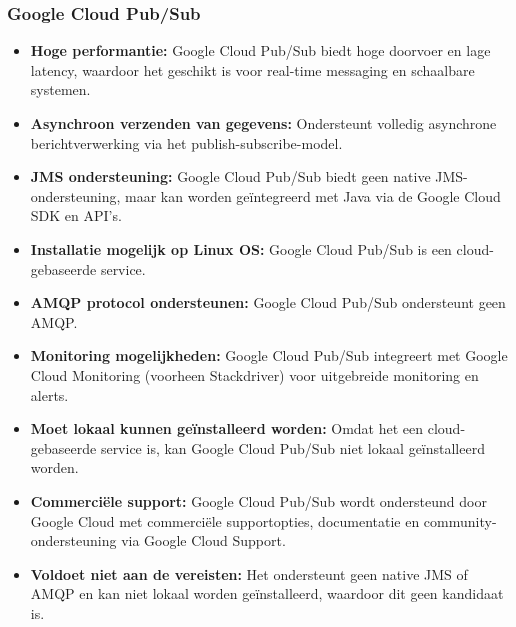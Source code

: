 \subsubsection{Google Cloud Pub/Sub}
\begin{itemize}
    \item \textbf{Hoge performantie:} Google Cloud Pub/Sub biedt hoge doorvoer en lage latency, waardoor het geschikt is voor real-time messaging en schaalbare systemen.
    \item \textbf{Asynchroon verzenden van gegevens:} Ondersteunt volledig asynchrone berichtverwerking via het publish-subscribe-model.
    \item \textbf{JMS ondersteuning:} Google Cloud Pub/Sub biedt geen native JMS-ondersteuning, maar kan worden geïntegreerd met Java via de Google Cloud SDK en API's.
    \item \textbf{Installatie mogelijk op Linux OS:} Google Cloud Pub/Sub is een cloud-gebaseerde service.
    \item \textbf{AMQP protocol ondersteunen:} Google Cloud Pub/Sub ondersteunt geen AMQP.
    \item \textbf{Monitoring mogelijkheden:} Google Cloud Pub/Sub integreert met Google Cloud Monitoring (voorheen Stackdriver) voor uitgebreide monitoring en alerts.
    \item \textbf{Moet lokaal kunnen geïnstalleerd worden:} Omdat het een cloud-gebaseerde service is, kan Google Cloud Pub/Sub niet lokaal geïnstalleerd worden.
    \item \textbf{Commerciële support:} Google Cloud Pub/Sub wordt ondersteund door Google Cloud met commerciële supportopties, documentatie en community-ondersteuning via Google Cloud Support.
    \item \textbf{Voldoet niet aan de vereisten:} Het ondersteunt geen native JMS of AMQP en kan niet lokaal worden geïnstalleerd, waardoor dit geen kandidaat is.
\end{itemize}
 
